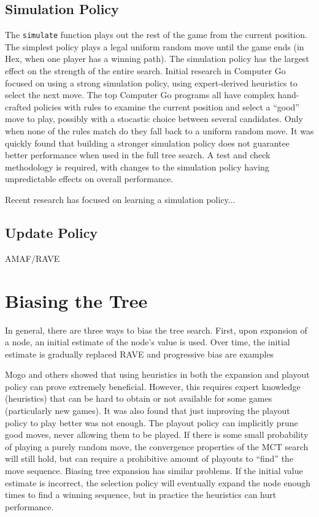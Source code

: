 \documentclass[10pt,a4paper]{report}
\begin{document}
\subsection{Simulation Policy}
The \texttt{simulate} function plays out the rest of the game from the current position. The simplest policy plays a legal uniform random move until the game ends (in Hex, when one player has a winning path). The simulation policy has the largest effect on the strength of the entire search. Initial research in Computer Go focused on using a strong simulation policy, using expert-derived heuristics to select the next move. The top Computer Go programs all have complex hand-crafted policies with rules to examine the current position and select a ``good'' move to play, possibly with a stocastic choice between several candidates. Only when none of the rules match do they fall back to a uniform random move. It was quickly found that building a stronger simulation policy does not guarantee better performance when used in the full tree search. A test and check methodology is required, with changes to the simulation policy having unpredictable effects on overall performance.

Recent research has focused on learning a simulation policy...

\subsection{Update Policy}
AMAF/RAVE

\section{Biasing the Tree}\label{bias}
In general, there are three ways to bias the tree search. First, upon expansion of a node, an initial estimate of the node's value is used. Over time, the initial estimate is gradually replaced RAVE and progressive bias are examples 

Mogo and others showed that using heuristics in both the expansion and playout policy can prove extremely beneficial. However, this requires expert knowledge (heuristics) that can be hard to obtain or not available for some games (particularly new games). It was also found that just improving the playout policy to play better was not enough. The playout policy can implicitly prune good moves, never allowing them to be played. If there is some small probability of playing a purely random move, the convergence properties of the MCT search will still hold, but can require a prohibitive amount of playouts to ``find'' the move sequence. Biasing tree expansion has similar problems. If the initial value estimate is incorrect, the selection policy will eventually expand the node enough times to find a winning sequence, but in practice the heuristics can hurt performance.
\end{document}
